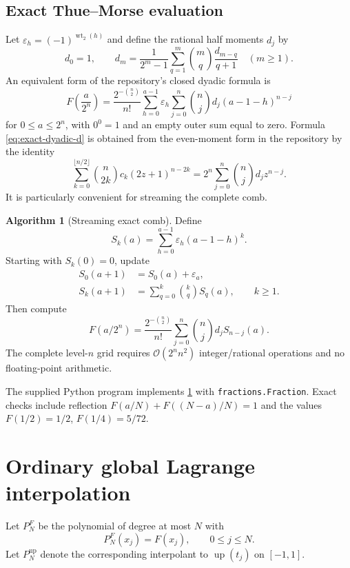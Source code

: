 \documentclass[11pt,oneside]{article}
\theoremstyle{definition}
\newtheorem{algorithm}[theorem]{Algorithm}
\theoremstyle{remark}
\newcommand{\Up}{\operatorname{up}}
\newcommand{\wt}{\operatorname{wt}_2}
\newcommand{\bigO}{\mathcal O}
\newcommand{\eps}{\varepsilon}
\begin{document}
\subsection{Exact Thue--Morse evaluation}

Let $\eps_h=(-1)^{\wt(h)}$ and define the rational half moments $d_j$ by
\begin{equation}
 d_0=1,
 \qquad
 d_m=\frac{1}{2^m-1}
 \sum_{q=1}^{m}\binom{m}{q}\frac{d_{m-q}}{q+1}
 \quad(m\ge1).
 \label{eq:d-recurrence}
\end{equation}
An equivalent form of the repository's closed dyadic formula is
\begin{equation}
 \boxed{
 F\!\left(\frac{a}{2^n}\right)
 =\frac{2^{-\binom n2}}{n!}
 \sum_{h=0}^{a-1}\eps_h
 \sum_{j=0}^{n}\binom nj d_j(a-1-h)^{n-j}}
 \label{eq:exact-dyadic-d}
\end{equation}
for $0\le a\le2^n$, with $0^0=1$ and an empty outer sum equal to zero.  Formula
\eqref{eq:exact-dyadic-d} is obtained from the even-moment form in the repository by the
identity
\[
 \sum_{k=0}^{\lfloor n/2\rfloor}\binom n{2k}c_k(2z+1)^{n-2k}
 =2^n\sum_{j=0}^{n}\binom njd_jz^{n-j}.
\]
It is particularly convenient for streaming the complete comb.

\begin{algorithm}[Streaming exact comb]
\label{alg:stream}
Define
\[
 S_k(a)=\sum_{h=0}^{a-1}\eps_h(a-1-h)^k.
\]
Starting with $S_k(0)=0$, update
\begin{align}
 S_0(a+1)&=S_0(a)+\eps_a,\\
 S_k(a+1)&=\sum_{q=0}^{k}\binom{k}{q}S_q(a),\qquad k\ge1.
 \label{eq:prefix-update}
\end{align}
Then compute
\[
 F(a/2^n)=\frac{2^{-\binom n2}}{n!}
 \sum_{j=0}^{n}\binom njd_jS_{n-j}(a).
\]
The complete level-$n$ grid requires $\bigO(2^n n^2)$ integer/rational operations and no
floating-point arithmetic.
\end{algorithm}

The supplied Python program implements \cref{alg:stream} with
\texttt{fractions.Fraction}.  Exact checks include reflection
$F(a/N)+F((N-a)/N)=1$ and the values $F(1/2)=1/2$, $F(1/4)=5/72$.

\section{Ordinary global Lagrange interpolation}
\label{sec:ordinary}

Let $P_N^F$ be the polynomial of degree at most $N$ with
\begin{equation}
 P_N^F(x_j)=F(x_j),\qquad 0\le j\le N.
 \label{eq:ordinary-F}
\end{equation}
Let $P_N^{\Up}$ denote the corresponding interpolant to $\Up(t_j)$ on $[-1,1]$.
\end{document}
